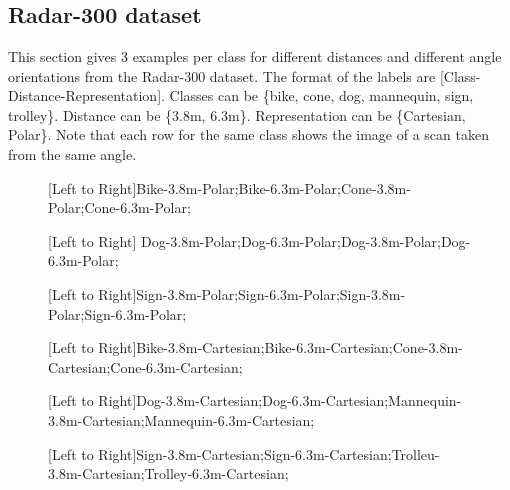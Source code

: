 \chapter{}

\section{Radar-300 dataset}\label{apa}
This section gives 3 examples per class for different distances and different angle orientations from the Radar-300 dataset. The format of the labels are [Class-Distance-Representation]. Classes can be \{bike, cone, dog, mannequin, sign, trolley\}. Distance can be \{3.8m, 6.3m\}. Representation can be \{Cartesian, Polar\}. Note that each row for the same class shows the image of a scan taken from the same angle. 

\begin{figure}[h]
	\centering
	\epsfxsize=7.5cm
	{}{}\caption{[Left to Right]Bike-3.8m-Polar;Bike-6.3m-Polar;Cone-3.8m-Polar;Cone-6.3m-Polar;}
	\label{fig:blocks}
\end{figure} 

\begin{figure}[h]
	\centering
	\epsfxsize=7.5cm
	{}{}\caption{[Left to Right] Dog-3.8m-Polar;Dog-6.3m-Polar;Dog-3.8m-Polar;Dog-6.3m-Polar;}
	\label{fig:blocks}
\end{figure} 

\begin{figure}[h]
	\centering
	\epsfxsize=7.5cm
	{}{}\caption{[Left to Right]Sign-3.8m-Polar;Sign-6.3m-Polar;Sign-3.8m-Polar;Sign-6.3m-Polar;}
	\label{fig:blocks}
\end{figure} 


\begin{figure}[h]
	\centering
	\epsfxsize=7.5cm
	{}{}\caption{[Left to Right]Bike-3.8m-Cartesian;Bike-6.3m-Cartesian;Cone-3.8m-Cartesian;Cone-6.3m-Cartesian;}
	\label{fig:blocks}
\end{figure} 

\begin{figure}[h]
	\centering
	\epsfxsize=7.5cm
	{}{}\caption{[Left to Right]Dog-3.8m-Cartesian;Dog-6.3m-Cartesian;Mannequin-3.8m-Cartesian;Mannequin-6.3m-Cartesian;}
	\label{fig:blocks}
\end{figure} 

\begin{figure}[h]
	\centering
	\epsfxsize=7.5cm
	{}{}\caption{[Left to Right]Sign-3.8m-Cartesian;Sign-6.3m-Cartesian;Trolleu-3.8m-Cartesian;Trolley-6.3m-Cartesian;}
	\label{fig:blocks}
\end{figure}

